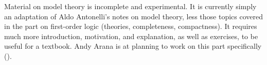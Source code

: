 \documentclass[../../include/open-logic-part]{subfiles}
\begin{document}

\begin{editorial}
  Material on model theory is incomplete and experimental.  It is
  currently simply an adaptation of Aldo Antonelli's notes on model
  theory, less those topics covered in the part on first-order logic
  (theories, completeness, compactness).  It requires much more
  introduction, motivation, and explanation, as well as exercises, to
  be useful for a textbook.  Andy Arana is at planning to work on this
  part specifically ().
\end{editorial}




\OLEndPartHook
\end{document}
